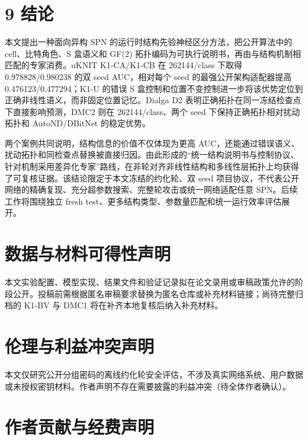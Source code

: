 \documentclass{templates/cjc-utf8}
\begin{document}
\hypertarget{ux7ed3ux8bba}{%
\section{9 结论}\label{ux7ed3ux8bba}}

本文提出一种面向异构 SPN 的运行时结构先验神经区分方法，把公开算法中的
cell、比特角色、S 盒语义和 GF(2)
拓扑编码为可执行说明书，再由与结构机制相匹配的专家消费。uKNIT
K1-CA/K1-CB 在 262144/class 下取得 0.978828/0.980238 的双 seed
AUC，相对每个 seed 的最强公开架构适配器提高
0.476123/0.477294；K1-U
的错误 S 盒控制和位置不变控制进一步将该优势定位到正确非线性语义，而非固定位置记忆。Dialga
D2 表明正确拓扑在同一冻结检查点下直接影响预测，DMC2 则在
262144/class、两个 seed 下保持正确拓扑相对扰动拓扑和 AutoND/DBitNet
的稳定优势。

两个案例共同说明，结构信息的价值不仅体现为更高
AUC，还能通过错误语义、扰动拓扑和同检查点替换被直接归因。由此形成的``统一结构说明书与控制协议、针对机制采用差异化专家''路线，在非轮对齐非线性结构和多线性层拓扑上均获得了可复核证据。该结论限定于本文冻结的约化轮、双
seed
项目协议，不代表公开网络的精确复现、充分超参数搜索、完整轮攻击或统一网络适配任意
SPN。后续工作将围绕独立 fresh
test、更多结构类型、参数量匹配和统一运行效率评估展开。

\hypertarget{ux6570ux636eux4e0eux6750ux6599ux53efux5f97ux6027ux58f0ux660e}{%
\section{数据与材料可得性声明}\label{ux6570ux636eux4e0eux6750ux6599ux53efux5f97ux6027ux58f0ux660e}}

本文实验配置、模型实现、结果文件和验证记录拟在论文录用或审稿政策允许的阶段公开。投稿前需根据匿名审稿要求替换为匿名仓库或补充材料链接；尚待完整归档的 K1-BV 与 DMC1 将在补齐本地复核后纳入补充材料。

\hypertarget{ux4f26ux7406ux4e0eux5229ux76caux51b2ux7a81ux58f0ux660e}{%
\section{伦理与利益冲突声明}\label{ux4f26ux7406ux4e0eux5229ux76caux51b2ux7a81ux58f0ux660e}}

本文仅研究公开分组密码的离线约化轮安全评估，不涉及真实网络系统、用户数据或未授权密钥材料。作者声明不存在需要披露的利益冲突（待全体作者确认）。

\hypertarget{ux4f5cux8005ux8d21ux732eux4e0eux7ecfux8d39ux58f0ux660e}{%
\section{作者贡献与经费声明}\label{ux4f5cux8005ux8d21ux732eux4e0eux7ecfux8d39ux58f0ux660e}}
\end{document}
